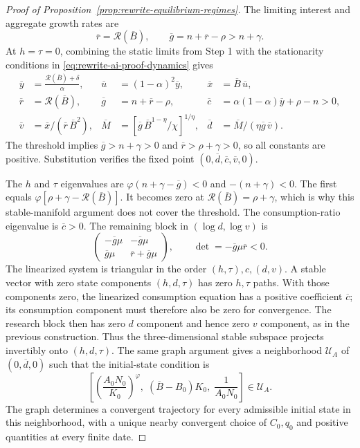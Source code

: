 \begin{proof}[Proof of Proposition~\ref{prop:rewrite-equilibrium-regimes}]
The limiting interest and aggregate growth rates are
\begin{equation}
 \overline r=\mathcal R(\overline B),\qquad
 \overline g=n+\overline r-\rho>n+\gamma.
 \label{eq:rewrite-substitutes-terminal-growth}
\end{equation}
At $h=\tau=0$, combining the static limits from Step 1 with the
stationarity conditions in \eqref{eq:rewrite-ai-proof-dynamics} gives
\begin{align}
 \overline y&=\frac{\mathcal R(\overline B)+\delta}{\alpha},&
 \overline u&=(1-\alpha)^2\overline y,&
 \overline x&=\overline B\,\overline u,\nonumber\\
 \overline r&=\mathcal R(\overline B),&
 \overline g&=n+\overline r-\rho,&
 \overline c&=\alpha(1-\alpha)\overline y+\rho-n>0,\nonumber\\
 \overline v&=\overline x/(\overline r\,\overline B^2),&
 \overline M&=
 \left[\overline g\,\overline B^{1-\eta}/\chi\right]^{1/\eta},&
 \overline d&=\overline M/(\eta\overline g\,\overline v).
 \label{eq:rewrite-ai-terminal-values}
\end{align}
The threshold implies $\overline g>n+\gamma>0$ and
$\overline r>\rho+\gamma>0$, so all constants are positive.
Substitution verifies the fixed point
$(0,\overline d,\overline c,\overline v,0)$.

The $h$ and $\tau$ eigenvalues are
$\varphi(n+\gamma-\overline g)<0$ and $-(n+\gamma)<0$.
The first equals $\varphi[\rho+\gamma-\mathcal R(\overline B)]$.
It becomes zero at $\mathcal R(\overline B)=\rho+\gamma$, which is why
this stable-manifold argument does not cover the threshold.
The consumption-ratio eigenvalue is $\overline c>0$.
The remaining block in $(\log d,\log v)$ is
\[
 \begin{pmatrix}
 -\overline g\mu&-\overline g\mu\\
 \overline g\mu&\overline r+\overline g\mu
 \end{pmatrix},
 \qquad \det=-\overline g\mu\overline r<0.
\]
The linearized system is triangular in the order
$(h,\tau),c,(d,v)$. A stable vector with zero state components $(h,d,\tau)$
has zero $h,\tau$ paths. With those components zero, the linearized
consumption equation has a positive coefficient $\overline c$; its
consumption component must therefore also be zero for convergence.
The research block then has zero
$d$ component and hence zero $v$ component, as in the previous construction.
Thus the three-dimensional stable subspace projects invertibly onto
$(h,d,\tau)$. The same graph argument gives a neighborhood
$\mathcal U_A$ of $(0,\overline d,0)$ such that the initial-state condition is
\begin{equation}
 \left[\left(\frac{A_0N_0}{K_0}\right)^\varphi,\;
       (\overline B-B_0)K_0,\; \frac{1}{A_0N_0}\right]\in\mathcal U_A.
 \label{eq:rewrite-ai-local-initial}
\end{equation}
The graph determines a convergent trajectory for every admissible initial state
in this neighborhood, with a unique nearby convergent choice
of $C_0,q_0$ and positive quantities at every finite date.


\end{proof}
